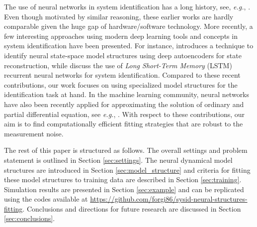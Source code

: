 \documentclass{article}
\begin{document}
The use of neural networks in system identification has a long history, see, \emph{e.g.}, \citep{werbos1989neural, chen1990non}. Even though motivated by similar reasoning, these earlier works are hardly comparable given the huge gap of hardware/software technology.    
More recently, a few interesting approaches using modern deep learning tools and concepts in system identification have been presented. For instance,   \citep{masti2018learning} introduces a technique to identify neural state-space model structures using deep autoencoders for state reconstruction, while 
\citep{gonzalez2018non, wang2017new} discuss the use of \emph{Long Short-Term Memory} (LSTM) recurrent neural networks for system identification.
Compared to these recent contributions, our work focuses on using specialized model structures for the identification task at hand. In the machine learning community, neural networks have also been recently applied for approximating the solution of ordinary and partial differential equation, see \emph{e.g.}, \citep{chen2018neural, raissi2019physics}. With respect to these contributions, our aim  is to find computationally efficient fitting strategies that are robust to the measurement noise.

The  rest of this paper is structured as follows. The overall settings and problem statement is outlined in Section \ref{sec:settings}. The neural dynamical model structures are introduced in Section \ref{sec:model_structure} and   criteria for fitting these model structures to training data are described in Section \ref{sec:training}. Simulation results are presented in Section \ref{sec:example} and can be replicated using the codes available at \url{https://github.com/forgi86/sysid-neural-structures-fitting}.  Conclusions and directions  for future research are  discussed in Section \ref{sec:conclusions}. 
\end{document}

